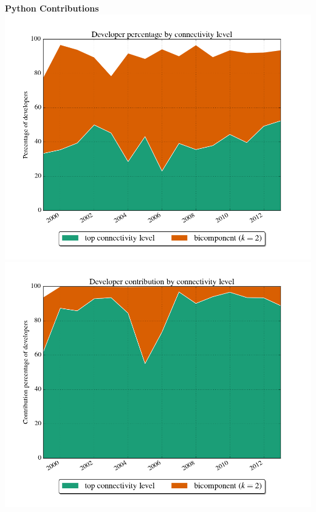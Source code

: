 \documentclass[ignorenonframetext,red,8pt]{beamer}
\begin{document}
\begin{frame}
\begin{columns}[c]
\begin{column}{0.5\textwidth}
\begin{center}
\textbf{Python Contributions}
\includegraphics[scale=0.16]{../../figures/evolution_developers_python_years}
\newline
\includegraphics[scale=0.16]{../../figures/evolution_connectivity_python_years}
\end{center}
\end{column}
\end{columns}
\end{frame}
\end{document}
